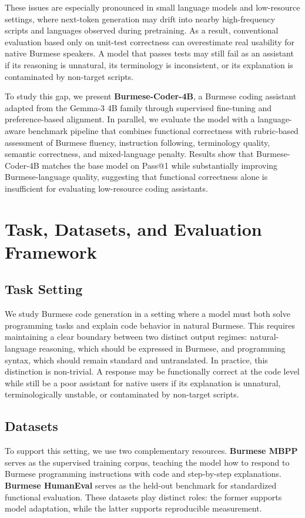 \documentclass[11pt]{article}
\begin{document}
These issues are especially pronounced in small language models and low-resource settings, where next-token generation may drift into nearby high-frequency scripts and languages observed during pretraining. As a result, conventional evaluation based only on unit-test correctness can overestimate real usability for native Burmese speakers. A model that passes tests may still fail as an assistant if its reasoning is unnatural, its terminology is inconsistent, or its explanation is contaminated by non-target scripts.

To study this gap, we present \textbf{Burmese-Coder-4B}, a Burmese coding assistant adapted from the Gemma-3 4B family through supervised fine-tuning and preference-based alignment. In parallel, we evaluate the model with a language-aware benchmark pipeline that combines functional correctness with rubric-based assessment of Burmese fluency, instruction following, terminology quality, semantic correctness, and mixed-language penalty. Results show that Burmese-Coder-4B matches the base model on Pass@1 while substantially improving Burmese-language quality, suggesting that functional correctness alone is insufficient for evaluating low-resource coding assistants.

\section{Task, Datasets, and Evaluation Framework}

\subsection{Task Setting}
We study Burmese code generation in a setting where a model must both solve programming tasks and explain code behavior in natural Burmese. This requires maintaining a clear boundary between two distinct output regimes: natural-language reasoning, which should be expressed in Burmese, and programming syntax, which should remain standard and untranslated. In practice, this distinction is non-trivial. A response may be functionally correct at the code level while still be a poor assistant for native users if its explanation is unnatural, terminologically unstable, or contaminated by non-target scripts.

\subsection{Datasets}
To support this setting, we use two complementary resources. \textbf{Burmese MBPP} serves as the supervised training corpus, teaching the model how to respond to Burmese programming instructions with code and step-by-step explanations. \textbf{Burmese HumanEval} serves as the held-out benchmark for standardized functional evaluation. These datasets play distinct roles: the former supports model adaptation, while the latter supports reproducible measurement.
\end{document}
